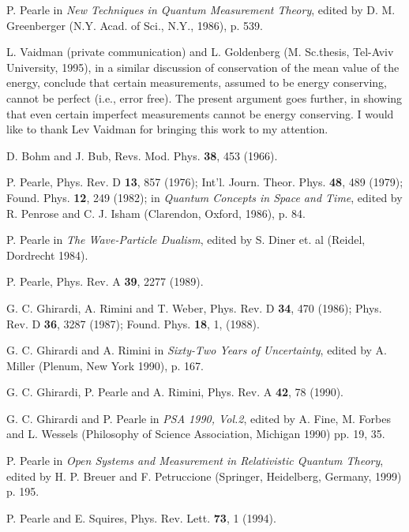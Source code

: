 \documentclass{article}
\begin{document}
\begin{thebibliography}{99}

P. Pearle in {\it New Techniques in Quantum Measurement Theory}, 
edited by D. M. Greenberger (N.Y. Acad. of Sci., N.Y., 1986), p. 539.

L. Vaidman (private communication) and L. Goldenberg (M. Sc.thesis, Tel-Aviv University, 1995),   
in a similar discussion of conservation of the mean value of the energy, conclude that 
certain measurements, assumed to be energy conserving, cannot be 
perfect (i.e., error free). The present argument 
goes further, in showing that even certain imperfect measurements cannot be energy conserving.  I would like 
to thank Lev Vaidman for bringing this work to my attention.    

D. Bohm and J. Bub, Revs. Mod. Phys. {\bf 38}, 453 (1966).

P. Pearle, Phys. Rev. D {\bf 13}, 857 (1976); 
Int'l. Journ. Theor. Phys. {\bf 48}, 489 (1979); Found. Phys. {\bf 12}, 249 (1982);
in {\it Quantum Concepts in Space and Time}, edited by R. Penrose and C. J. 
Isham (Clarendon, Oxford, 1986), p. 84.
 
 P. Pearle in 
{\it The Wave-Particle Dualism}, edited by S. Diner et. al (Reidel, Dordrecht 1984).

P. Pearle, Phys. Rev. A {\bf 39}, 2277 (1989).

 G. C. Ghirardi, A. Rimini and T. Weber, Phys. Rev. D {\bf 34}, 470 (1986); 
Phys. Rev. D {\bf 36}, 3287 (1987); Found. Phys. {\bf 18}, 1, (1988).

G. C. Ghirardi and A. Rimini in {\it Sixty-Two Years of Uncertainty}, 
edited by A. Miller (Plenum, New  York 1990), p. 167.

G. C. Ghirardi, P. Pearle and A. Rimini, Phys. Rev. A {\bf 42}, 78 (1990).

G. C. Ghirardi and P. Pearle in {\it PSA 1990, Vol.2}, edited by A. Fine, M. Forbes and 
L. Wessels (Philosophy of Science Association, Michigan 1990) pp. 19, 35. 

P. Pearle in {\it Open Systems and Measurement in Relativistic Quantum Theory}, 
 edited by H. P. Breuer and F. Petruccione (Springer, Heidelberg, Germany, 1999) p. 195.
   
P. Pearle and E. Squires, Phys. Rev. Lett. {\bf 73}, 1 (1994).


\end{thebibliography}
\end{document}
